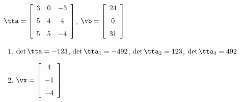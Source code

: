 {$\tta = \left[ \begin {array}{ccc} 3&0&-3\\\noalign{\medskip}5&4&4
\\\noalign{\medskip}5&5&-4\end {array} \right]$,
 \quad
$\vb = \left[ \begin {array}{c} 24\\\noalign{\medskip}0\\\noalign{\medskip}
31\end {array} \right] $}
{\begin{enumerate}
\item	$\det{\tta} = -123$, $\det{\tta_1} = -492$, $\det{\tta_2} = 123$, $\det{\tta_3} = 492$
\item $\vx = \left[ \begin {array}{c} 4\\\noalign{\medskip}-1\\\noalign{\medskip}-4\end {array} \right]$
\end{enumerate}
}

